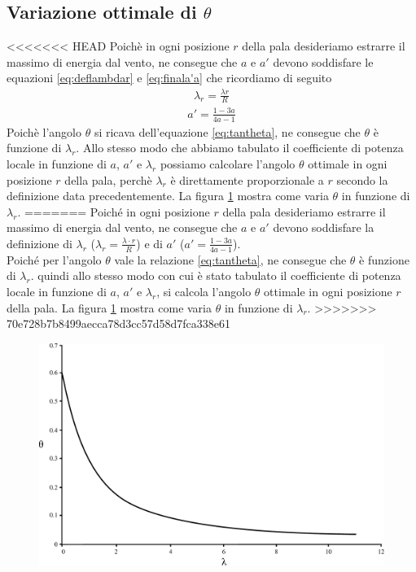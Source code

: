\subsection{Variazione ottimale di $\theta$}
<<<<<<< HEAD
Poichè in ogni posizione $r$ della pala desideriamo estrarre il massimo di energia dal vento, ne consegue che $a$ e $a'$ devono soddisfare le equazioni \ref{eq:deflambdar}  e \ref{eq:finala'a} che ricordiamo di seguito
\begin{align*}
\lambda_r = \frac{\lambda r}{R}
\end{align*}
\begin{align*}
a' = \frac{1-3a}{4a-1}
\end{align*}
Poichè l'angolo $\theta$ si ricava dell'equazione \ref{eq:tantheta}, ne consegue che $\theta$ è funzione di $\lambda_r$. Allo stesso modo che abbiamo tabulato il coefficiente di potenza locale in funzione di $a$, $a'$ e $\lambda_r$ possiamo calcolare l'angolo $\theta$ ottimale in ogni posizione $r$ della pala, perchè $\lambda_r$ è direttamente proporzionale a $r$ secondo la definizione data precedentemente. La figura \ref{fig:lambdatheta} mostra come varia $\theta$ in funzione di $\lambda_r$.
=======
Poiché in ogni posizione $r$ della pala desideriamo estrarre il massimo di energia dal vento, ne consegue che $a$ e $a'$ devono soddisfare la definizione di $\lambda_r$ ($\lambda_r = \frac{\lambda \cdot r}{R}$) e di $a'$ ($a' = \frac{1 - 3a}{4a -1}$).\\
Poiché per l'angolo $\theta$ vale la relazione \ref{eq:tantheta}, ne consegue che $\theta$ è funzione di $\lambda_r$. quindi allo stesso modo con cui è stato tabulato il coefficiente di potenza locale in funzione di $a$, $a'$ e $\lambda_r$, si calcola l'angolo $\theta$ ottimale in ogni posizione $r$ della pala. La figura \ref{fig:lambdatheta} mostra come varia $\theta$ in funzione di $\lambda_r$.
>>>>>>> 70e728b7b8499aecca78d3cc57d58d7fca338e61
\begin{figure}[h!]
\centering
  \includegraphics[width=.7\textwidth]{fig/lambdatheta.pdf}
\caption{}
\label{fig:lambdatheta}
\end{figure}
